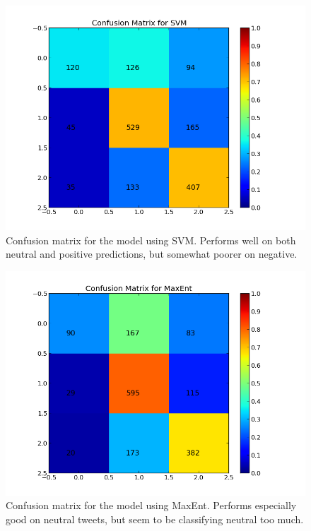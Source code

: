 \begin{minipage}[s]{\linewidth}
     \centering
     \begin{minipage}{0.45\linewidth}
          \begin{figure}[H]
               \includegraphics[width=\linewidth]{../img/plots/grid/confusion_matrix_SVM.png}
           \caption[Plot showing the confusion matrix for SVM]{Confusion matrix for the model using SVM. Performs well on both neutral and positive predictions, but somewhat poorer on negative.}
           \label{fig:confmat_svm}
          \end{figure}
     \end{minipage}
     \hspace{0.05\linewidth}
     \begin{minipage}{0.45\linewidth}
          \begin{figure}[H]
               \includegraphics[width=\linewidth]{../img/plots/grid/confusion_matrix_MaxEnt.png}
           \caption[Plot showing the confusion matrix for MaxEnt]{Confusion matrix for the model using MaxEnt. Performs especially good on neutral tweets, but seem to be classifying neutral too much.}
           \label{fig:confmat_maxent}
          \end{figure}
     \end{minipage} \\
 

\end{minipage}
